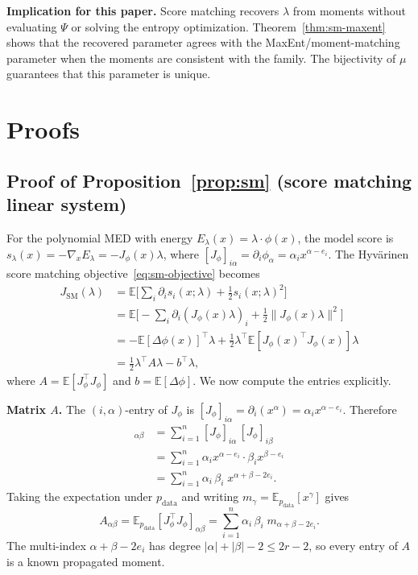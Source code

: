 \documentclass{article}
\newcommand{\E}{\mathbb{E}}
\theoremstyle{definition}
\begin{document}
\textbf{Implication for this paper.}
Score matching recovers $\lambda$ from moments without evaluating $\Psi$
or solving the entropy optimization.
Theorem~\ref{thm:sm-maxent} shows that the recovered parameter agrees
with the MaxEnt/moment-matching parameter when the moments are consistent
with the family.
The bijectivity of $\mu$ guarantees that this parameter is unique.

\section{Proofs}
\label{app:proofs}

\subsection{Proof of Proposition~\ref{prop:sm} (score matching linear system)}

For the polynomial MED with energy $E_\lambda(x) = \lambda \cdot \phi(x)$,
the model score is $s_\lambda(x) = -\nabla_x E_\lambda = -J_\phi(x)\lambda$,
where $[J_\phi]_{i\alpha} = \partial_i \phi_\alpha = \alpha_i x^{\alpha - e_i}$.
The Hyv\"arinen score matching objective~\eqref{eq:sm-objective} becomes
\begin{align}
    J_{\mathrm{SM}}(\lambda)
    &= \E\biggl[\sum_i \partial_i s_i(x;\lambda)
    + \frac{1}{2} s_i(x;\lambda)^2\biggr] \nonumber\\
    &= \E\biggl[-\sum_i \partial_i(J_\phi(x) \lambda)_i
    + \frac{1}{2}\|J_\phi(x)\lambda\|^2\biggr] \nonumber\\
    &= -\E[\Delta\phi(x)]^\top\lambda
    + \frac{1}{2}\lambda^\top\E[J_\phi(x)^\top J_\phi(x)]\lambda \nonumber\\
    &= \frac{1}{2}\lambda^\top A\lambda - b^\top\lambda,
\end{align}
where $A = \E[J_\phi^\top J_\phi]$ and $b = \E[\Delta\phi]$.
We now compute the entries explicitly.

\textbf{Matrix $A$.}
The $(i,\alpha)$-entry of $J_\phi$ is
$[J_\phi]_{i\alpha} = \partial_i(x^\alpha) = \alpha_i x^{\alpha - e_i}$.
Therefore
\begin{align}
    [J_\phi^\top J_\phi]_{\alpha\beta}
    &= \sum_{i=1}^n [J_\phi]_{i\alpha}\,[J_\phi]_{i\beta} \nonumber\\
    &= \sum_{i=1}^n \alpha_i x^{\alpha - e_i} \cdot \beta_i x^{\beta - e_i} \nonumber\\
    &= \sum_{i=1}^n \alpha_i\,\beta_i\; x^{\alpha + \beta - 2e_i}.
\end{align}
Taking the expectation under $p_{\mathrm{data}}$
and writing $m_\gamma = \E_{p_{\mathrm{data}}}[x^\gamma]$ gives
\begin{equation}
    A_{\alpha\beta} = \E_{p_{\mathrm{data}}}[J_\phi^\top J_\phi]_{\alpha\beta}
    = \sum_{i=1}^n \alpha_i\,\beta_i\; m_{\alpha+\beta-2e_i}.
\end{equation}
The multi-index $\alpha + \beta - 2e_i$ has degree
$|\alpha| + |\beta| - 2 \le 2r - 2$,
so every entry of $A$ is a known propagated moment.
\end{document}
